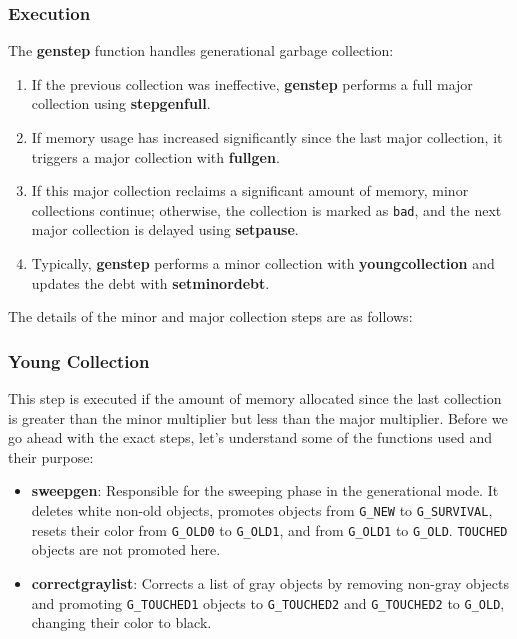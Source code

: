 \documentclass[10pt]{article}
\begin{document}
\subsubsection{Execution}
The \textbf{genstep} function handles generational garbage collection:
\begin{enumerate}
    \item If the previous collection was ineffective, \textbf{genstep} performs a full major collection using \textbf{stepgenfull}.
    \item If memory usage has increased significantly since the last major collection, it triggers a major collection with \textbf{fullgen}.
    \item If this major collection reclaims a significant amount of memory, minor collections continue; otherwise, the collection is marked as \texttt{bad}, and the next major collection is delayed using \textbf{setpause}.
    \item Typically, \textbf{genstep} performs a minor collection with \textbf{youngcollection} and updates the debt with \textbf{setminordebt}.
\end{enumerate}
 The details of the minor and major collection steps are as follows:

\subsubsection{Young Collection}
This step is executed if the amount of memory allocated since the last collection is greater than the minor multiplier but less than the major multiplier. Before we go ahead with the exact steps, let's understand some of the functions used and their purpose:

\begin{itemize}
  \item \textbf{sweepgen}: Responsible for the sweeping phase in the generational mode. It deletes white non-old objects, promotes objects from \texttt{G\_NEW} to \texttt{G\_SURVIVAL}, resets their color from \texttt{G\_OLD0} to \texttt{G\_OLD1}, and from \texttt{G\_OLD1} to \texttt{G\_OLD}. \texttt{TOUCHED} objects are not promoted here.
  \item \textbf{correctgraylist}: Corrects a list of gray objects by removing non-gray objects and promoting \texttt{G\_TOUCHED1} objects to \texttt{G\_TOUCHED2} and \texttt{G\_TOUCHED2} to \texttt{G\_OLD}, changing their color to black.
\end{itemize}
\end{document}
